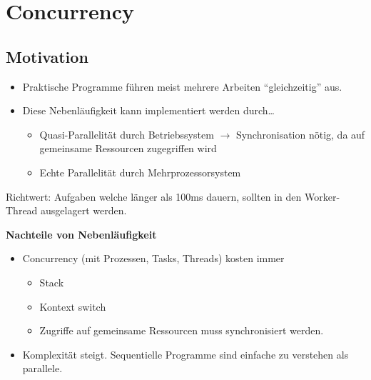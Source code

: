 \section{Concurrency }
\subsection{Motivation}
\begin{itemize}
  \item Praktische Programme führen meist mehrere Arbeiten "`gleichzeitig"' aus. 
  \item Diese Nebenläufigkeit kann implementiert werden durch\ldots
  \begin{itemize}
    \item Quasi-Parallelität durch Betriebssystem $\rightarrow$ Synchronisation
    nötig, da auf gemeinsame Ressourcen zugegriffen wird
    \item Echte Parallelität durch Mehrprozessorsystem
  \end{itemize}
\end{itemize}
Richtwert: Aufgaben welche länger als 100ms dauern, sollten in den Worker-Thread ausgelagert werden.

\textbf{Nachteile von Nebenläufigkeit}
\begin{itemize}
  \item  Concurrency (mit Prozessen, Tasks, Threads) kosten immer
  \begin{itemize}
    \item  Stack
    \item  Kontext switch
    \item  Zugriffe auf gemeinsame Ressourcen muss synchronisiert werden.
  \end{itemize}
  \item  Komplexität steigt. Sequentielle Programme sind einfache zu verstehen als parallele.
\end{itemize}

